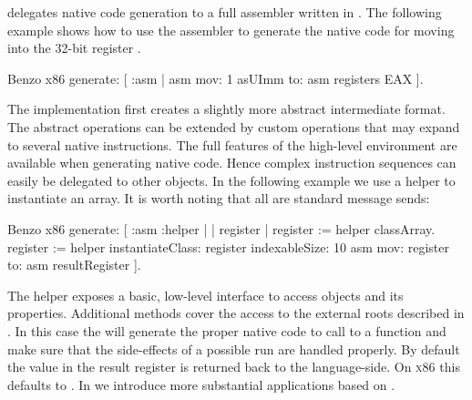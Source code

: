 \B delegates native code generation to a full assembler written in \PH. The following example shows how to use the assembler to generate the native code for moving  into the 32-bit register .
%
\begin{stcode}{4}
Benzo x86 generate: [ :asm |
	asm mov: 1 asUImm to: asm registers EAX ].
\end{stcode}
%
The implementation first creates a slightly more abstract intermediate format.
The abstract operations can be extended by custom operations that may expand to several native instructions. 
The full features of the high-level environment are available when generating native code.
Hence complex instruction sequences can easily be delegated to other objects.
In the following example we use a \VM helper to instantiate an array. It is worth noting that all are standard message sends:
%
\begin{stcode}{5}
Benzo x86 generate: [ :asm :helper | | register |
	register := helper classArray.
	register := helper 
		instantiateClass: register
		indexableSize: 10
	asm mov: register to: asm resultRegister ].
\end{stcode}
%
The \VM helper exposes a basic, low-level interface to access objects and its properties.
Additional methods cover the access to the external roots described in .
In this case the  will generate the proper native code to call to a \VM function and make sure that the side-effects of a possible \GC run are handled properly.
By default the value in the result register is returned back to the language-side. On \textsc{x86} this defaults to .
In  we introduce more substantial applications based on \B.

